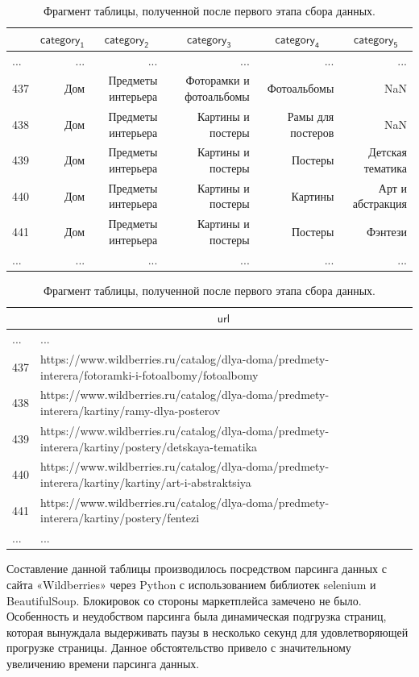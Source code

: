 \documentclass[a4paper,12pt]{extarticle}
\begin{document}
\begin{table}[ht]
\caption{Фрагмент таблицы, полученной после первого этапа сбора данных.}
\label{table:datastatistic0}
\footnotesize
\centering
	\begin{tabular}{lrrrrr}
		\toprule
		{} & \multicolumn{1}{c}{$\mathsf{category_1}$} &\multicolumn{1}{c}{$\mathsf{category_2}$} &  \multicolumn{1}{c}{$\mathsf{category_3}$} & \multicolumn{1}{c}{$\mathsf{category_4}$} &  \multicolumn{1}{c}{$\mathsf{category_5}$}\\
		\midrule
		... & ... & ... & ... & ... & ... \\
		437 & Дом & Предметы интерьера & Фоторамки и фотоальбомы & Фотоальбомы       & NaN\\
		438 & Дом & Предметы интерьера & Картины и постеры       & Рамы для постеров & NaN\\
		439 & Дом & Предметы интерьера & Картины и постеры       & Постеры           & Детская тематика\\
		440 & Дом & Предметы интерьера & Картины и постеры       & Картины           & Арт и абстракция\\
		441 & Дом & Предметы интерьера & Картины и постеры       & Постеры           & Фэнтези\\
		... & ... & ... & ... & ... & ... \\
		\bottomrule
	\end{tabular}
	\begin{tabular}{ll}
		\toprule
		{} & \multicolumn{1}{c}{$\mathsf{url}$}\\
		\midrule
		... & ... \\
		437 & https://www.wildberries.ru/catalog/dlya-doma/predmety-interera/fotoramki-i-fotoalbomy/fotoalbomy\\
		438 & https://www.wildberries.ru/catalog/dlya-doma/predmety-interera/kartiny/ramy-dlya-posterov\\
		439 & https://www.wildberries.ru/catalog/dlya-doma/predmety-interera/kartiny/postery/detskaya-tematika\\
		440 & https://www.wildberries.ru/catalog/dlya-doma/predmety-interera/kartiny/kartiny/art-i-abstraktsiya\\
		441 & https://www.wildberries.ru/catalog/dlya-doma/predmety-interera/kartiny/postery/fentezi\\
		... & ... \\
		\bottomrule
	\end{tabular}
\end{table}


Составление данной таблицы производилось посредством парсинга данных с сайта «Wildberries» через Python с использованием библиотек selenium и BeautifulSoup. Блокировок со стороны маркетплейса замечено не было. Особенность и неудобством парсинга была динамическая подгрузка страниц, которая вынуждала выдерживать паузы в несколько секунд для удовлетворяющей прогрузке страницы. Данное обстоятельство привело с значительному увеличению времени парсинга данных.
\end{document}
